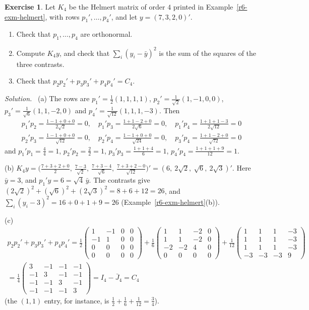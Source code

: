 \documentclass[12pt]{article}
\theoremstyle{definition}
\newtheorem{exercise}{Exercise}
\newenvironment{solution}{\par\noindent\textit{Solution.}\ }{\par\smallskip}
\begin{document}
\begin{exercise}\label{r6-dr-helmert}
Let \(K_4\) be the Helmert matrix of order \(4\) printed in Example~\ref{r6-exm-helmert}, with rows
\(p_1',\dots,p_4'\), and let \(y=(7,3,2,0)'\).
\begin{enumerate}
\item Check that \(p_1,\dots,p_4\) are orthonormal.
\item Compute \(K_4y\), and check that \(\sum_i(y_i-\bar y)^2\) is the sum of the squares of the three contrasts.
\item Check that \(p_2p_2'+p_3p_3'+p_4p_4'=C_4\).
\end{enumerate}
\end{exercise}
\begin{solution}
(a) The rows are \(p_1'=\frac12(1,1,1,1)\), \(p_2'=\frac1{\sqrt2}(1,-1,0,0)\), \(p_3'=\frac1{\sqrt6}(1,1,-2,0)\) and
\(p_4'=\frac1{\sqrt{12}}(1,1,1,-3)\). Then
\[
\begin{gathered}
p_1'p_2=\frac{1-1+0+0}{2\sqrt2}=0,\quad p_1'p_3=\frac{1+1-2+0}{2\sqrt6}=0,\quad p_1'p_4=\frac{1+1+1-3}{2\sqrt{12}}=0\\
p_2'p_3=\frac{1-1+0+0}{\sqrt{12}}=0,\quad p_2'p_4=\frac{1-1+0+0}{\sqrt{24}}=0,\quad p_3'p_4=\frac{1+1-2+0}{\sqrt{72}}=0
\end{gathered}
\]
and \(p_1'p_1=\frac44=1\), \(p_2'p_2=\frac22=1\), \(p_3'p_3=\frac{1+1+4}6=1\), \(p_4'p_4=\frac{1+1+1+9}{12}=1\).

(b) \(K_4y=\bigl(\frac{7+3+2+0}2,\ \frac{7-3}{\sqrt2},\ \frac{7+3-4}{\sqrt6},\ \frac{7+3+2-0}{\sqrt{12}}\bigr)'
=(6,\ 2\sqrt2,\ \sqrt6,\ 2\sqrt3)'\). Here \(\bar y=3\), and \(p_1'y=6=\sqrt4\,\bar y\). The contrasts give
\((2\sqrt2)^2+(\sqrt6)^2+(2\sqrt3)^2=8+6+12=26\), and \(\sum_i(y_i-3)^2=16+0+1+9=26\)
(Example~\ref{r6-exm-helmert}(b)).

(c)
\[
\begin{gathered}
p_2p_2'+p_3p_3'+p_4p_4'=\frac12\begin{pmatrix}1&-1&0&0\\-1&1&0&0\\0&0&0&0\\0&0&0&0\end{pmatrix}
+\frac16\begin{pmatrix}1&1&-2&0\\1&1&-2&0\\-2&-2&4&0\\0&0&0&0\end{pmatrix}
+\frac1{12}\begin{pmatrix}1&1&1&-3\\1&1&1&-3\\1&1&1&-3\\-3&-3&-3&9\end{pmatrix}\\
=\frac14\begin{pmatrix}3&-1&-1&-1\\-1&3&-1&-1\\-1&-1&3&-1\\-1&-1&-1&3\end{pmatrix}=I_4-\bar J_4=C_4
\end{gathered}
\]
(the \((1,1)\) entry, for instance, is \(\frac12+\frac16+\frac1{12}=\frac34\)).
\end{solution}
\end{document}
